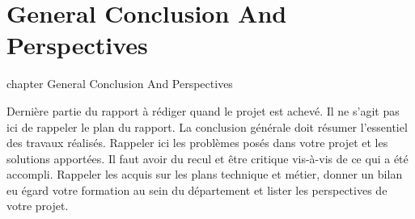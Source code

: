 

\chapter*{General Conclusion And Perspectives}  {chapter} {General Conclusion And Perspectives}


Dernière partie du rapport à rédiger quand le projet est achevé.  Il ne s’agit pas ici de rappeler le plan du rapport. La conclusion générale doit résumer l’essentiel des travaux réalisés. Rappeler ici les problèmes posés dans votre projet et les solutions apportées. Il faut avoir du recul et être critique vis-à-vis de ce qui a été accompli. Rappeler les acquis sur les plans technique et métier, donner un bilan eu égard votre formation au sein du département et lister les perspectives de votre projet.